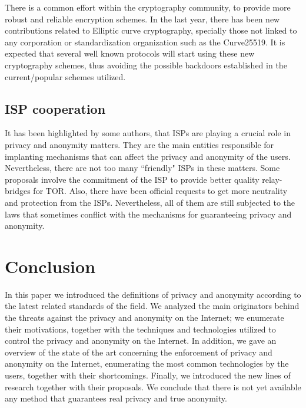 \documentclass[conference]{IEEEtran}
\begin{document}
There is a common effort within the cryptography community, to provide more robust and reliable encryption schemes. In the last year, there has been new contributions related to Elliptic curve cryptography, specially those not linked to any corporation or standardization organization such as the Curve25519\cite{25519}. It is expected that several well known protocols will start using  these new cryptography schemes, thus avoiding the possible backdoors established in the current/popular schemes utilized.

\subsection{ISP cooperation}

It has been highlighted by some authors\cite{cirri}, that ISPs are playing a crucial role in privacy and anonymity matters. They are the main entities responsible for implanting mechanisms that can affect the privacy and anonymity of the users. Nevertheless, there are not too many ``friendly" ISPs in these matters. Some proposals involve the commitment of the ISP to provide better quality relay-bridges for TOR\cite{cirri}. Also, there have been official requests to get more neutrality and protection from the ISPs. Nevertheless, all of them are still subjected to the laws that sometimes conflict with the mechanisms for guaranteeing privacy and anonymity.

\section{Conclusion}

In this paper we introduced the definitions of privacy and anonymity according to the latest related standards of the field. We analyzed the main originators behind the threats against the privacy and anonymity on the Internet; we enumerate their motivations, together with the techniques and technologies utilized to control the privacy and anonymity on the Internet. In addition, we gave an overview of the state of the art concerning the enforcement of privacy and anonymity on the Internet, enumerating the most common technologies by the users, together with their shortcomings. Finally, we introduced the new lines of research together with their proposals. We conclude that there is not yet available any method that guarantees real privacy and true anonymity.
\end{document}

